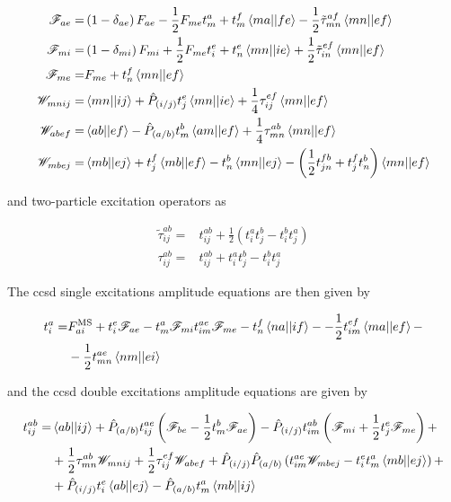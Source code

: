\begin{align}
\mathscr{F}_{ae}=&\left(1-\delta_{ae}\right)F_{ae}-\frac{1}{2}F_{me}t_m^a+t_m^f\braket{ma||fe}-\frac{1}{2}\tilde{\tau}_{mn}^{af}\braket{mn||ef} \\
\mathscr{F}_{mi}=&\left(1-\delta_{mi}\right)F_{mi}+\frac{1}{2}F_{me}t_i^e+t_n^e\braket{mn||ie}+\frac{1}{2}\tilde{\tau}_{in}^{ef}\braket{mn||ef} \\
\mathscr{F}_{me}=&F_{me}+t_n^f\braket{mn||ef} \\
\mathscr{W}_{mnij}=&\braket{mn||ij}+\hat{P}_{(i/j)}t_j^e\braket{mn||ie}+\frac{1}{4}\tau_{ij}^{ef}\braket{mn||ef} \\
\mathscr{W}_{abef}=&\braket{ab||ef}-\hat{P}_{(a/b)}t_m^b\braket{am||ef}+\frac{1}{4}\tau_{mn}^{ab}\braket{mn||ef} \\
\mathscr{W}_{mbej}=&\braket{mb||ej}+t_j^f\braket{mb||ef}-t_n^b\braket{mn||ej}-\left(\frac{1}{2}t_{jn}^{fb}+t_j^ft_n^b\right)\braket{mn||ef}
\end{align}

and two-particle excitation operators as

\begin{align}
\tilde{\tau}_{ij}^{ab}=&t_{ij}^{ab}+\frac{1}{2}\left(t_i^at_j^b-t_i^bt_j^a\right) \\
\tau_{ij}^{ab}=&t_{ij}^{ab}+t_i^at_j^b-t_i^bt_j^a
\end{align}

The \acrshort{ccsd} single excitations amplitude equations are then given by

\begin{align}
t_i^a=&F_{ai}^{\mathrm{MS}}+t_i^e\mathscr{F}_{ae}-t_m^a\mathscr{F}_{mi}t_{im}^{ae}\mathscr{F}_{me}-t_n^f\braket{na||if}-\nonumber-\frac{1}{2}t_{im}^{ef}\braket{ma||ef}- \\
&-\frac{1}{2}t_{mn}^{ae}\braket{nm||ei}
\end{align}

and the \acrshort{ccsd} double excitations amplitude equations are given by

\begin{align}
t_{ij}^{ab}=&\braket{ab||ij}+\hat{P}_{(a/b)}t_{ij}^{ae}\left(\mathscr{F}_{be}-\frac{1}{2}t_m^b\mathscr{F}_{ae}\right)-\hat{P}_{(i/j)}t_{im}^{ab}\left(\mathscr{F}_{mi}+\frac{1}{2}t_j^e\mathscr{F}_{me}\right)+\nonumber \\
&+\frac{1}{2}\tau_{mn}^{ab}\mathscr{W}_{mnij}+\frac{1}{2}\tau_{ij}^{ef}\mathscr{W}_{abef}+\hat{P}_{(i/j)}\hat{P}_{(a/b)}\left(t_{im}^{ae}\mathscr{W}_{mbej}-t_i^et_m^a\braket{mb||ej}\right)+\nonumber \\
&+\hat{P}_{(i/j)}t_i^e\braket{ab||ej}-\hat{P}_{(a/b)}t_m^a\braket{mb||ij}
\end{align}

